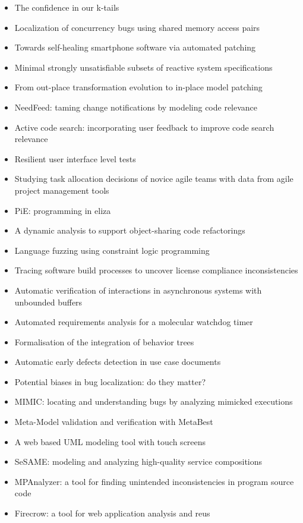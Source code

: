 {\begin{itemize}[itemsep=-1ex]
  \item The confidence in our k-tails
  \item Localization of concurrency bugs using shared memory access pairs
  \item Towards self-healing smartphone software via automated patching
  \item Minimal strongly unsatisfiable subsets of reactive system specifications
  \item From out-place transformation evolution to in-place model patching
  \item NeedFeed: taming change notifications by modeling code relevance
  \item Active code search: incorporating user feedback to improve code search relevance
  \item Resilient user interface level tests
  \item Studying task allocation decisions of novice agile teams with data from agile project management tools
  \item PiE: programming in eliza
  \item A dynamic analysis to support object-sharing code refactorings
  \item Language fuzzing using constraint logic programming
  \item Tracing software build processes to uncover license compliance inconsistencies
  \item Automatic verification of interactions in asynchronous systems with unbounded buffers
  \item Automated requirements analysis for a molecular watchdog timer
  \item Formalisation of the integration of behavior trees
  \item Automatic early defects detection in use case documents
  \item Potential biases in bug localization: do they matter?
  \item MIMIC: locating and understanding bugs by analyzing mimicked executions
  \item Meta-Model validation and verification with MetaBest
  \item A web based UML modeling tool with touch screens
  \item SeSAME: modeling and analyzing high-quality service compositions
  \item MPAnalyzer: a tool for finding unintended inconsistencies in program source code
  \item Firecrow: a tool for web application analysis and reus

\end{itemize}}
